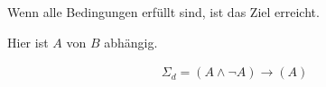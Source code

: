 Wenn alle Bedingungen erfüllt sind, ist das Ziel erreicht.

Hier ist $A$ von $B$ abhängig. 

\begin{eqnarray}
	\Sigma_{d} = \left( A \land \lnot A  \right) \rightarrow \left( A \right) 
\end{eqnarray}
